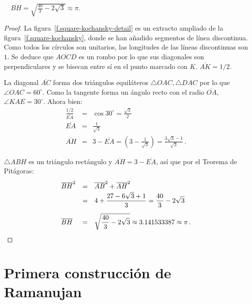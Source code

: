 \begin{theorem}
$\quad\overline{BH}=\sqrt{\displaystyle\frac{40}{3}-2\sqrt{3}}\approx \pi$.
\end{theorem}
\begin{proof}
La figura~\ref{f.square-kochansky-detail} es un extracto ampliado de la figura~\ref{f.square-kochansky}, donde se han añadido segmentos de línea discontinua. Como todos los círculos son unitarios, las longitudes de las líneas discontinuas son $1$. Se deduce que $\overline{AOCD}$ es un rombo por lo que sus diagonales son perpendiculares y se bisecan entre sí en el punto marcado con $K$. $\overline{AK}=1/2$.

La diagonal $\overline{AC}$ forma dos triángulos equiláteros $\triangle OAC, \triangle DAC$ por lo que $\angle OAC=60^\circ$. Como la tangente forma un ángulo recto con el radio $\overline{OA}$, $\angle KAE=30^\circ$. Ahora bien:
\begin{displaymath}
\renewcommand{\arraystretch}{1.5}
\begin{array}{lcl}
\displaystyle\frac{1/2}{\overline{EA}}&=&
\cos 30^\circ=\displaystyle\frac{\sqrt{3}}{2}\\
\overline{EA}&=&\displaystyle\frac{1}{\sqrt{3}}\\
\overline{AH}&=&3-\overline{EA}=\left(3-\displaystyle\frac{1}{\sqrt{3}}\right)
=\displaystyle\frac{3\sqrt{3}-1}{\sqrt{3}}\,.
\end{array}
\end{displaymath}

$\triangle ABH$ es un triángulo rectángulo y $\overline{AH}=3-\overline{EA}$, así que por el Teorema de Pitágoras:
\begin{displaymath}
\renewcommand{\arraystretch}{1.5}
\begin{array}{lcl}
\overline{BH}^2&=&\overline{AB}^2+\overline{AH}^2\\
&=&4+\displaystyle\frac{27 -6\sqrt{3}+1}{3}=\frac{40}{3}-2\sqrt{3}\\
\overline{BH}&=&\rule{0pt}{25pt}\sqrt{\displaystyle\frac{40}{3}-2\sqrt{3}}\approx 3.141533387\approx \pi\,.
\end{array}
\end{displaymath}
\end{proof}


\section{Primera construcción de Ramanujan}\label{s.square-ramanujan-first}


